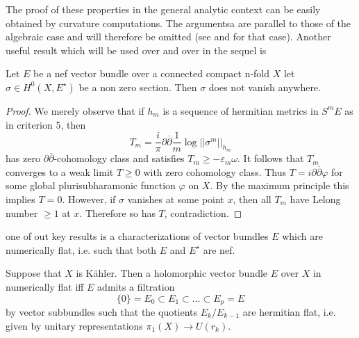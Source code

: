 The proof of these properties in the general analytic context can be easily obtained by curvature computations. The argumentsa are parallel to those of the algebraic case and will therefore be omitted (see \cite{art5-keyHa66} and \cite{art5-keyCP91} for that case). Another useful result which will be used over and over in the sequel is

\begin{prop}\label{art5-definition-1.7}
Let $E$ be a nef vector bundle over a connected compact n-fold $X$ let $\sigma \in H^{0}(X, E^{\star})$ be a non zero section. Then $\sigma$ does not vanish anywhere.
\end{prop}

\begin{proof}
We merely observe that if $h_{m}$ is a sequence of hermitian metrics in $S^{m}E$ as in criterion 5, then
$$
T_{m}=\dfrac{i}{\pi} \partial\overline{\partial} \dfrac{1}{m}\log||\sigma^{m}||_{h_{m}}
$$
has zero $\partial\overline{\partial}$-cohomology class and satisfies $T_{m}\geq -\varepsilon_{m}\omega$. It follows that $T_{m}$ converges to a weak limit $T\geq 0$ with zero cohomology class. Thus $T= i\partial\overline{\partial}\varphi$ for some global plurisubharamonic function $\varphi$ on $X$. By the maximum principle this implies $T=0$. However, if $\sigma$ vanishes at some point $x$, then all $T_{m}$ have Lelong number $\geq 1$ at $x$. Therefore so has $T$, contradiction.
\end{proof}

one of out key results is a characterizations of vector bumdles $E$ which are numerically flat, i.e. such that both $E$ and $E^{\star}$ are nef.

\begin{theorem}\label{art5-thm-1.8}
Suppose that $X$ is K\"ahler. Then a holomorphic vector bundle $E$ over $X$ in numerically flat iff $E$ admits a filtration
$$
\{0 \} = E_{0}\subset E_{1}\subset \ldots \subset E_{p} = E
$$
by vector subbundles such that the quotients $E_{k}/E_{k-1}$ are hermitian flat, i.e. given by unitary representations $\pi_{1}(X) \rightarrow U(r_{k})$.
\end{theorem}

